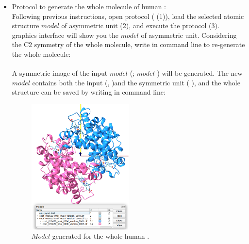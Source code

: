 \begin{itemize}

 \item Protocol  to generate the whole molecule of human :\\
 
 Following previous instructions, open \chimera {} protocol ( (1)), load 
 the selected atomic structure $model$ of  asymmetric unit (2), and execute the protocol (3). \chimera graphics interface will show you the $model$ of  asymmetric unit. Considering the C2 symmetry of the whole molecule, write in \chimera command line to re-generate the whole molecule:\\
 
 \\
 
 A symmetric image of the input $model$ (; $model$ ) will be generated. The new $model$  contains both the input (,  )and the symmetric unit ( ), and the whole structure can be saved by writing in \chimera command line:\\
 
 
 \begin{figure}[H]
    \centering 
    \captionsetup{width=.9\linewidth} 
    \includegraphics[width=0.50\textwidth]{Images/Fig41}
    \caption{$Model$ generated for the whole human .}
    \label{fig:chimera_operate_sym}
   \end{figure}
 

\end{itemize}
